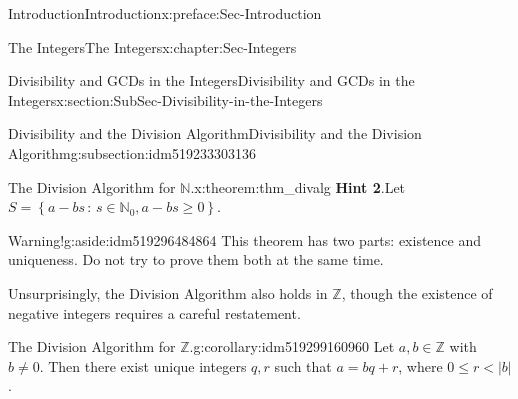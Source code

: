 \documentclass[oneside,10pt,]{book}
\newcommand{\blocktitlefont}{\relax}
\numberwithin{equation}{section}
\renewcommand{\le}{\leqslant}
\renewcommand{\ge}{\geqslant}
\newcommand{\setof}[2]{{\left\{#1\,\colon\,#2\right\}}}
\def\Z{{\mathbb Z}}
\def\N{{\mathbb N}}
\newcommand{\lt}{<}
\begin{document}
\begin{preface}{Introduction}{}{Introduction}{}{}{x:preface:Sec-Introduction}
\begin{chapterptx}{The Integers}{}{The Integers}{}{}{x:chapter:Sec-Integers}
\begin{sectionptx}{Divisibility and GCDs in the Integers}{}{Divisibility and GCDs in the Integers}{}{}{x:section:SubSec-Divisibility-in-the-Integers}
\begin{subsectionptx}{Divisibility and the Division Algorithm}{}{Divisibility and the Division Algorithm}{}{}{g:subsection:idm519233303136}
\begin{theorem}{The Division Algorithm for \(\N\).}{}{x:theorem:thm_divalg}
\noindent
\textbf{\blocktitlefont Hint 2}.\quad{}Let \(S = \setof{a-bs}{s\in \N_0, a-bs\ge 0}\).%
\end{theorem}
\begin{aside}{Warning!}{g:aside:idm519296484864}%
This theorem has two parts: existence and uniqueness. Do not try to prove them both at the same time.%
\end{aside}
Unsurprisingly, the Division Algorithm also holds in \(\Z\), though the existence of negative integers requires a careful restatement. %
\begin{corollary}{The Division Algorithm for \(\Z\).}{}{g:corollary:idm519299160960}%
\index{Division Algorithm (\(\Z\))}%
Let \(a,b\in \Z\) with \(b\ne 0\). Then there exist unique integers \(q,r\) such that \(a = bq + r\), where \(0 \le r \lt |b|\).%



\end{corollary}
\end{subsectionptx}
\end{sectionptx}
\end{chapterptx}
\end{preface}
\end{document}
